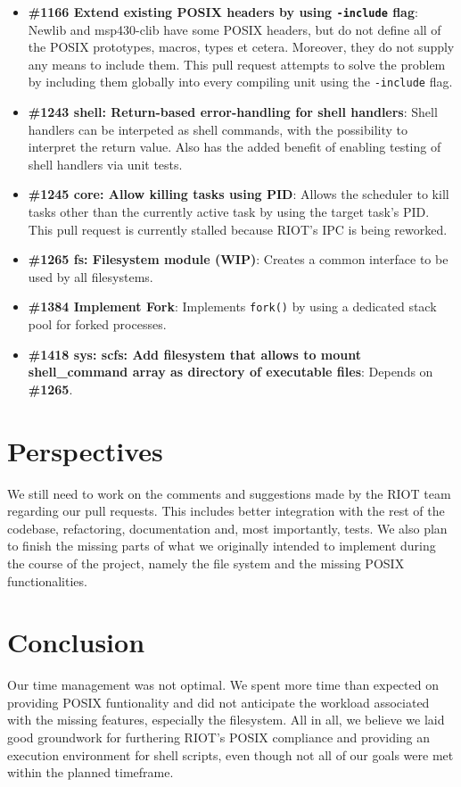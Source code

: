 \documentclass[conference]{IEEEtran}
\begin{document}
\begin{itemize}
  \item \textbf{\#1166 Extend existing POSIX headers by using
    \texttt{-include} flag}: Newlib and msp430-clib have some POSIX
    headers, but do not define all of the POSIX prototypes, macros,
    types et cetera.  Moreover, they do not supply any means to include
    them. This pull request attempts to solve the problem by including
    them globally into every compiling unit using the \texttt{-include}
    flag.
  \item \textbf{\#1243 shell: Return-based error-handling for shell
    handlers}: Shell handlers can be interpeted as shell commands, with
    the possibility to interpret the return value. Also has the added
    benefit of enabling testing of shell handlers via unit tests.
  \item \textbf{\#1245 core: Allow killing tasks using PID}: Allows the
    scheduler to kill tasks other than the currently active task by
    using the target task's PID. This pull request is currently stalled
    because RIOT's IPC is being reworked.
  \item \textbf{\#1265 fs: Filesystem module (WIP)}: Creates a common
    interface to be used by all filesystems.
  \item \textbf{\#1384 Implement Fork}: Implements \texttt{fork()} by
    using a dedicated stack pool for forked processes.
  \item \textbf{\#1418 sys: scfs: Add filesystem that allows to mount
    shell\_command array as directory of executable files}: Depends on
    \textbf{\#1265}.
\end{itemize}

\section{Perspectives}
\label{sec:Perspectives}
We still need to work on the comments and suggestions made by the RIOT
team regarding our pull requests. This includes better integration with
the rest of the codebase, refactoring, documentation and, most
importantly, tests. We also plan to finish the missing parts of what we
originally intended to implement during the course of the project,
namely the file system and the missing POSIX functionalities.

\section{Conclusion}
\label{sec:Conclusion}
Our time management was not optimal. We spent more time than expected on
providing POSIX funtionality and did not anticipate the workload
associated with the missing features, especially the filesystem. All in
all, we believe we laid good groundwork for furthering RIOT's POSIX
compliance and providing an execution environment for shell scripts,
even though not all of our goals were met within the planned timeframe.
\end{document}
